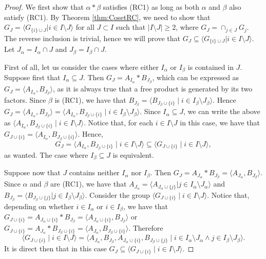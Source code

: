 \documentclass[11pt,letterpaper]{amsart}
\begin{document}
\begin{proof}

    We first show that $\alpha * \beta$ satisfies (RC1) as long as both $\alpha$ and $\beta$ also satisfy (RC1). By Theorem \ref{thm:CosetRC}, we need to show that $G_J = \langle G_{\{i\} \cup J} | i \in I \setminus J \rangle$ for all $J \subset I$ such that $|I \setminus J| \geq 2$, where $G_J = \cap_{j \in J} G_j$. The reverse inclusion is trivial, hence we will prove that $G_J \subseteq \langle G_{\{i\} \cup J} | i \in I \setminus J \rangle$. Let $J_\alpha = I_\alpha \cap J$ and $J_\beta = I_\beta \cap J$.
    
    First of all, let us consider the cases where either $I_\alpha$ or $I_\beta$ is contained in $J$. 
    Suppose first that $I_\alpha \subseteq J$. Then $G_J=A_{I_\alpha}*B_{J_\beta}$, which can be expressed as $G_J=\langle A_{I_\alpha},B_{J_\beta}\rangle$, as it is always true that a free product is generated by its two factors.
    Since $\beta$ is (RC1), we have that $B_{J_\beta}=\langle B_{J_\beta\cup\{i\}}\mid i\in I_\beta\setminus J_\beta\rangle$. Hence $G_J = \langle A_{I_\alpha},B_{J_\beta}\rangle = \langle A_{I_\alpha}, B_{J_\beta\cup\{i\}}\mid i\in I_\beta\setminus J_\beta\rangle$.
    Since $I_\alpha \subseteq J$, we can write the above as 
    $\langle A_{I_\alpha}, B_{J_\beta\cup\{i\}}\mid i\in I\setminus J\rangle$.
    Notice that, for each $i\in I\setminus J$ in this case, we have that $G_{J\cup\{i\}}=\langle A_{I_\alpha}, B_{J_\beta\cup\{i\}}\rangle$.
    Hence, $$G_J=\langle A_{I_\alpha}, B_{J_\beta\cup\{i\}}\mid i\in I\setminus J\rangle \subseteq \langle G_{J\cup\{i\}} \mid i \in I\setminus J\rangle  ,$$
    as wanted.
    The case where $I_\beta \subseteq J$ is equivalent.
    
    Suppose now that $J$ contains neither $I_\alpha$ nor $I_\beta$. Then $G_J = A_{J_\alpha} * B_{J_\beta} = \langle A_{J_\alpha},B_{J_\beta}\rangle$.
    Since $\alpha$ and $\beta$ are (RC1), we have that $A_{J_\alpha} = \langle A_{J_\alpha \cup \{j\}} | j \in I_\alpha \setminus J_\alpha \rangle$ and $B_{J_\beta} = \langle B_{J_\beta \cup \{j\}} | j \in I_\beta \setminus J_\beta \rangle$.
    Consider the group $\langle G_{J\cup\{i\}}\mid i\in I\setminus J\rangle$. Notice that, depending on whether $i\in I_\alpha$ or $i\in I_\beta$, we have that $G_{J\cup\{i\}}= A_{J_\alpha\cup\{i\}}* B_{J_\beta}=\langle A_{J_\alpha\cup\{i\}}, B_{J_\beta} \rangle$ or $G_{J\cup\{i\}}= A_{J_\alpha}* B_{J_\beta\cup \{i\}}=\langle A_{J_\alpha}, B_{J_\beta\cup\{i\}} \rangle$.
    Therefore $$\langle G_{J\cup\{i\}}\mid i\in I\setminus J\rangle = \langle A_{J_\alpha},B_{J_\beta}, A_{J_\alpha\cup \{i\}}, B_{J_\beta\cup \{j\}}\mid i\in I_\alpha\setminus J_\alpha \wedge j\in I_\beta\setminus J_\beta\rangle. $$
    It is direct then that in this case $G_J \subseteq \langle G_{J\cup\{i\}}\mid i\in I\setminus J\rangle$.
    

\end{proof}
\end{document}
